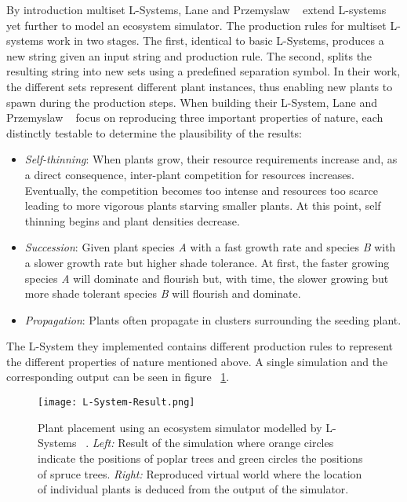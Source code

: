By introduction multiset L-Systems, Lane and Przemyslaw ~\cite{Lane2002} extend L-systems yet further to model an ecosystem simulator. The production rules for multiset L-systems work in two stages. The first, identical to basic L-Systems, produces a new string given an input string and production rule. The second, splits the resulting string into new sets using a predefined separation symbol. In their work, the different sets represent different plant instances, thus enabling new plants to spawn during the production steps. When building their L-System, Lane and Przemyslaw ~\cite{Lane2002} focus on reproducing three important properties of nature, each distinctly testable to determine the plausibility of the results:
\begin{itemize}
\item \textit{Self-thinning}: When plants grow, their resource requirements increase and, as a direct consequence, inter-plant competition for resources increases. Eventually, the competition becomes too intense and resources too scarce leading to more vigorous plants starving smaller plants. At this point, self thinning begins and plant densities decrease.
\item \textit{Succession}: Given plant species \textit{A} with a fast growth rate and species \textit{B} with a slower growth rate but higher shade tolerance. At first, the faster growing species \textit{A} will dominate and flourish but, with time, the slower growing but more shade tolerant species \textit{B} will flourish and dominate.
\item \textit{Propagation}: Plants often propagate in clusters surrounding the seeding plant.
\end{itemize}

The L-System they implemented contains different production rules to represent the different properties of nature mentioned above. A single simulation and the corresponding output can be seen in figure ~\ref{fig:plant_placement_using_an_ecosystem_simulator_modelled_by_L_system}.

\begin{figure}[h]
  \centering
    \texttt{[image: L-System-Result.png]}
    \caption[Plant placement using an ecosystem simulator modelled by L-Systems]{ Plant placement using an ecosystem simulator modelled by L-Systems ~\cite{Lane2002}. \textit{Left:} Result of the simulation where orange circles indicate the positions of poplar trees and green circles the positions of spruce trees. \textit{Right:} Reproduced virtual world where the location of individual plants is deduced from the output of the simulator.}
    \label{fig:plant_placement_using_an_ecosystem_simulator_modelled_by_L_system}
\end{figure}

